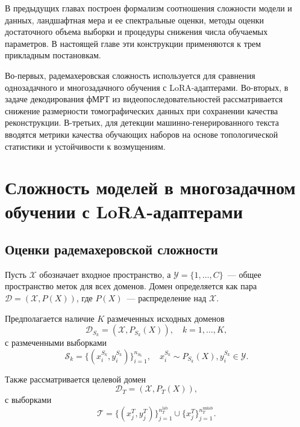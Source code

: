 В предыдущих главах построен формализм соотношения сложности модели и данных, ландшафтная мера и ее спектральные оценки, методы оценки достаточного объема выборки и процедуры снижения числа обучаемых параметров.
В настоящей главе эти конструкции применяются к трем прикладным постановкам.

Во-первых, радемахеровская сложность используется для сравнения однозадачного и многозадачного обучения с LoRA-адаптерами.
Во-вторых, в задаче декодирования фМРТ из видеопоследовательностей рассматривается снижение размерности томографических данных при сохранении качества реконструкции.
В-третьих, для детекции машинно-генерированного текста вводятся метрики качества обучающих наборов на основе топологической статистики и устойчивости к возмущениям.

\section{Сложность моделей в многозадачном обучении с LoRA-адаптерами}

\subsection{Оценки радемахеровской сложности}
Пусть $\mathcal{X}$ обозначает входное пространство, а $\mathcal{Y} = \{1, \dots, C\}$~--- общее пространство меток для всех доменов.
Домен определяется как пара $\mathcal{D} = (\mathcal{X}, P(X))$, где $P(X)$~--- распределение над $\mathcal{X}$.

Предполагается наличие $K$ размеченных исходных доменов
\begin{equation}
    \mathcal{D}_{S_k} = (\mathcal{X}, P_{S_k}(X)),
    \quad k = 1, \dots, K,
\end{equation}
с размеченными выборками
\begin{equation}
    \mathcal{S}_k = \{(x_i^{S_k}, y_i^{S_k})\}_{i=1}^{n_{S_k}},
    \quad x_i^{S_k} \sim P_{S_k}(X),  y_i^{S_k} \in \mathcal{Y}.
\end{equation}

Также рассматривается целевой домен
\begin{equation}
    \mathcal{D}_T = (\mathcal{X}, P_T(X)),
\end{equation}
с выборками
\begin{equation}
    \mathcal{T} = \{(x_j^T, y_j^T)\}_{j=1}^{n_T^{\text{lab}}} \cup \{x_j^T\}_{j=1}^{n_T^{\text{unlab}}}.
\end{equation}


